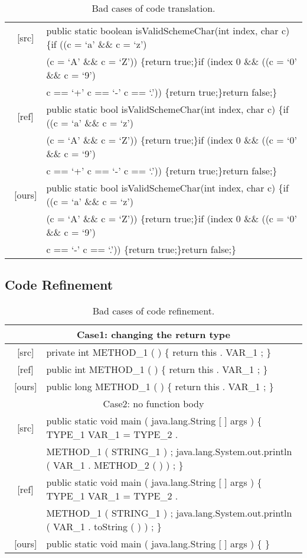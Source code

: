 \documentclass{article} \usepackage{iclr2021_conference,times}
\begin{document}
\begin{table*}[h!]
\begin{center}
\begin{tabular}{c|l}
\midrule
\ [src] & public static boolean isValidSchemeChar(int index, char c) \{if ((c = `a' \&\& c = `z')  \\
& (c = `A' \&\& c = `Z')) \{return true;\}if (index  0 \&\& ((c = `0' \&\& c = `9')  \\
& c == `+'  c == `-'  c == `.')) \{return true;\}return false;\} \\
\hline
\ [ref] & public static bool isValidSchemeChar(int index, char c) \{if ((c = `a' \&\& c = `z')  \\
& (c = `A' \&\& c = `Z')) \{return true;\}if (index  0 \&\& ((c = `0' \&\& c = `9')  \\
& c == `+'  c == `-'  c == `.')) \{return true;\}return false;\} \\
\hline
\ [ours] & public static bool isValidSchemeChar(int index, char c) \{if ((c = `a' \&\& c = `z')  \\
& (c = `A' \&\& c = `Z')) \{return true;\}if (index  0 \&\& ((c = `0' \&\& c = `9')  \\
& c == `-'  c == `.')) \{return true;\}return false;\} \\
\bottomrule
\end{tabular}
\end{center}
\caption{\label{tab:trans_bad_case} Bad cases of code translation.}
\end{table*}

\subsection{Code Refinement}
\begin{table*}[h!]
\small
\begin{center}
\begin{tabular}{c|l}
\toprule 
\multicolumn{2}{c}{Case1: changing the return type} \\
\midrule
\ [src] & private int METHOD\_1 ( ) \{ return this . VAR\_1 ; \} \\
\hline
\ [ref] & public int METHOD\_1 ( ) \{ return this . VAR\_1 ; \} \\
\hline
\ [ours] & public long METHOD\_1 ( ) \{ return this . VAR\_1 ; \}\\
\midrule
\multicolumn{2}{c}{Case2: no function body} \\
\midrule
\ [src] & public static void main ( java.lang.String [ ] args ) \{ TYPE\_1 VAR\_1 = TYPE\_2 . \\
& METHOD\_1 ( STRING\_1 ) ; java.lang.System.out.println ( VAR\_1 . METHOD\_2 ( ) ) ; \} \\
\hline
\ [ref] & public static void main ( java.lang.String [ ] args ) \{ TYPE\_1 VAR\_1 = TYPE\_2 . \\
& METHOD\_1 ( STRING\_1 ) ; java.lang.System.out.println ( VAR\_1 . toString ( ) ) ; \} \\
\hline
\ [ours] &public static void main ( java.lang.String [ ] args ) \{ \}\\
\bottomrule
\end{tabular}
\end{center}
\caption{\label{tab:refine_bad_case} Bad cases of code refinement.}
\end{table*}
\fi 
\end{document}

